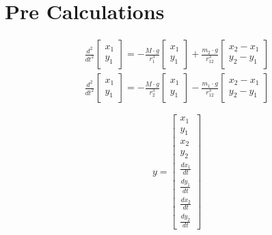 \section{Pre Calculations}
\begin{equation}
\begin{align*}
\frac { { d }^{ 2 } }{ { dt }^{ 2 } } \left[ \begin{matrix} x_{ 1 } \\ y_{ 1 } \end{matrix} \right] =-\frac { M\cdot g }{ { r }^{ 3 }_{ 1 } } \left[ \begin{matrix} x_{ 1 } \\ y_{ 1 } \end{matrix} \right] +\frac { m_{ 2 }\cdot g }{ { r }^{ 3 }_{ 12 } } \left[ \begin{matrix} x_{ 2 }-x_{ 1 } \\ y_{ 2 }-y_{ 1 } \end{matrix} \right] \\ 
\frac { { d }^{ 2 } }{ { dt }^{ 2 } } \left[ \begin{matrix} x_{ 1 } \\ y_{ 1 } \end{matrix} \right] =-\frac { M\cdot g }{ { r }^{ 3 }_{ 2 } } \left[ \begin{matrix} x_{ 1 } \\ y_{ 1 } \end{matrix} \right] -\frac { m_{ 1 }\cdot g }{ { r }^{ 3 }_{ 12 } } \left[ \begin{matrix} x_{ 2 }-x_{ 1 } \\ y_{ 2 }-y_{ 1 } \end{matrix} \right] 
\end{align*}
\label{eq:3}
\end{equation}



\begin{equation}
y=\left[ \begin{matrix} x_1\\ y_1\\ x_2\\ y_2\\ \frac { dx_1 }{ dt } \\ \frac { dy_1}{ dt } \\ \frac { dx_2}{ dt } \\ \frac { dy_2 }{ dt } \end{matrix}  \right]
\label{eq:5}
\end{equation}


